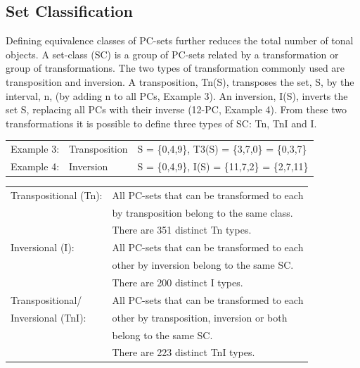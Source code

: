 \documentclass{article}
\begin{document}
\subsection{Set Classification}
\label{sec-3-2}

Defining equivalence classes of PC-sets further reduces the total
number of tonal objects. A set-class (SC) is a group of PC-sets
related by a transformation or group of transformations. The two types
of transformation commonly used are transposition and inversion. A
transposition, Tn(S), transposes the set, S, by the interval, n, (by
adding n to all PCs, Example 3). An inversion, I(S), inverts the set
S, replacing all PCs with their inverse (12-PC, Example 4). From these
two transformations it is possible to define three types of SC: Tn,
TnI and I.


\begin{center}
\begin{tabular}{lll}
 Example 3:  &  Transposition  &  S = \{0,4,9\}, T3(S) = \{3,7,0\} = \{0,3,7\}   \\
 Example 4:  &  Inversion      &  S = \{0,4,9\}, I(S) = \{11,7,2\} = \{2,7,11\}  \\
\end{tabular}
\end{center}




\begin{center}
\begin{tabular}{ll}
 Transpositional (Tn):  &  All PC-sets that can be transformed to each  \\
                        &  by transposition belong to the same class.   \\
                        &  There are 351 distinct Tn types.             \\
 Inversional (I):       &  All PC-sets that can be transformed to each  \\
                        &  other by inversion belong to the same SC.    \\
                        &  There are 200 distinct I types.              \\
 Transpositional/       &  All PC-sets that can be transformed to each  \\
 Inversional (TnI):     &  other by transposition, inversion or both    \\
                        &  belong to the same SC.                       \\
                        &  There are 223 distinct TnI types.            \\
\end{tabular}
\end{center}
\end{document}
